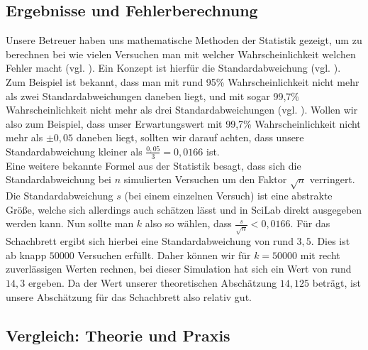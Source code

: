 \documentclass[11pt,a4paper]{article}
\numberwithin{equation}{section}
\numberwithin{table}{section}
\numberwithin{figure}{section}
\begin{document}
\subsection{Ergebnisse und Fehlerberechnung}
Unsere Betreuer haben uns mathematische Methoden der Statistik gezeigt, um zu berechnen bei wie vielen Versuchen man mit welcher Wahrscheinlichkeit welchen Fehler macht (vgl. \cite{stat}). Ein Konzept ist hierfür die Standardabweichung (vgl. \cite{varianz}). Zum Beispiel ist bekannt, dass man mit rund 95\% Wahrscheinlichkeit nicht mehr als zwei Standardabweichungen daneben liegt, und mit sogar 99,7\% Wahrscheinlichkeit nicht mehr als drei Standardabweichungen (vgl. \cite{normal}). Wollen wir also zum Beispiel, dass unser Erwartungswert mit 99,7\% Wahrscheinlichkeit nicht mehr als $\pm 0,05$ daneben liegt, sollten wir darauf achten, dass unsere Standardabweichung kleiner als $\frac{0,05}{3}=0,0166$ ist.\\
Eine weitere bekannte Formel aus der Statistik besagt, dass sich die Standardabweichung bei $n$ simulierten Versuchen um den Faktor $\sqrt{n}$ verringert. Die Standardabweichung $s$ (bei einem einzelnen Versuch) ist eine abstrakte Größe, welche sich allerdings auch schätzen lässt und in SciLab direkt ausgegeben werden kann. Nun sollte man $k$ also so wählen, dass $\frac{s}{\sqrt{n}}<0,0166$. 
Für das Schachbrett ergibt sich hierbei eine Standardabweichung von rund $3,5$. Dies ist ab knapp $50000$ Versuchen erfüllt. Daher können wir für $k=50000$ mit recht zuverlässigen Werten rechnen, bei dieser Simulation hat sich ein Wert von rund $14,3$ ergeben. Da der Wert unserer theoretischen Abschätzung $14,125$ beträgt, ist unsere Abschätzung für das Schachbrett also relativ gut.
\subsection{Vergleich: Theorie und Praxis}
\end{document}
